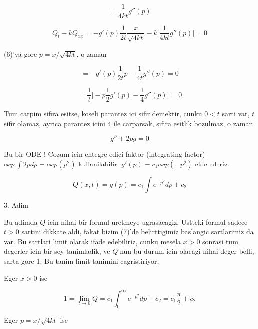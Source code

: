 \documentclass[12pt,fleqn]{article}
\begin{document}
\[ = \frac{1}{4kt}g''(p) \]

\[ Q_t - kQ_{xx} = 
- g'(p)\frac{1}{2t} \frac{x}{\sqrt{4kt}} -
k\bigg[ 
 \frac{1}{4kt}g''(p) 
\bigg] = 0
 \]

(6)'ya gore $p = x/\sqrt{4kt}$, o zaman 

\[ =
- g'(p)\frac{1}{2t} p - \frac{1}{4t}g''(p)  = 0
 \]

\[ = \frac{1}{t} \bigg[
-p\frac{1}{2}g'(p) - \frac{1}{4}g''(p)
\bigg] = 0
 \]

Tum carpim sifira esitse, koseli parantez ici sifir demektir, cunku $0 < t$
sarti var, $t$ sifir olamaz, ayrica parantez icini 4 ile carparsak, sifira
esitlik bozulmaz, o zaman 

\[ g'' + 2pg = 0 \]

Bu bir ODE ! Cozum icin entegre edici faktor (integrating factor)
 $exp \
\int 2p dp = exp(p^2)$ kullanilabilir. $g'(p) = c_1 exp(-p^2)$ elde
ederiz. 

\[ Q(x,t) = g(p) = c_1 \int e^{-p^2} dp + c_2 \]


3. Adim 

Bu adimda $Q$ icin nihai bir formul uretmeye ugrasacagiz. Ustteki formul
sadece $t>0$ sartini dikkate aldi, fakat bizim (7)'de belirttigimiz
baslangic sartlarimiz da var. Bu sartlari limit olarak ifade edebiliriz,
cunku mesela $x>0$ sonrasi tum degerler icin bir sey tanimladik, ve $Q$'nun bu
durum icin olacagi nihai deger belli, sarta gore 1. Bu tanim limit tanimini
cagristiriyor, 

Eger $x>0$ ise

\[ 1 = \lim_{t \to 0} Q = 
 c_1 \int_0^{\infty} e^{-p^2} dp + c_2 = 
c_1 \frac{\pi}{2} + c_2
 \]

Eger  $p = x/\sqrt{4kt}$ ise 
\end{document}
